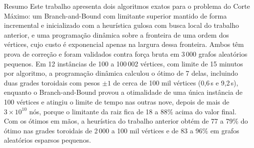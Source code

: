 \begin{resumobloco}{Resumo}
Este trabalho apresenta dois algoritmos exatos para o problema do Corte Máximo: um Branch-and-Bound com limitante superior mantido de forma incremental e inicializado com a heurística gulosa com busca local do trabalho anterior, e uma programação dinâmica sobre a fronteira de uma ordem dos vértices, cujo custo é exponencial apenas na largura dessa fronteira. Ambos têm prova de correção e foram validados contra força bruta em 3\,000 grafos aleatórios pequenos. Em 12 instâncias de 100 a 100\,002 vértices, com limite de 15 minutos por algoritmo, a programação dinâmica calculou o ótimo de 7 delas, incluindo duas grades toroidais com pesos $\pm1$ de cerca de 100 mil vértices (0,6\,s e 9,2\,s), enquanto o Branch-and-Bound provou a otimalidade de uma única instância de 100 vértices e atingiu o limite de tempo nas outras nove, depois de mais de $3\times10^{10}$ nós, porque o limitante da raiz fica de 18 a 88\% acima do valor final. Com os ótimos em mãos, a heurística do trabalho anterior obtém de 77 a 79\% do ótimo nas grades toroidais de 2\,000 a 100 mil vértices e de 83 a 96\% em grafos aleatórios esparsos pequenos.
\end{resumobloco}
\vspace{4pt}




\renewcommand{\refname}{Referências}


